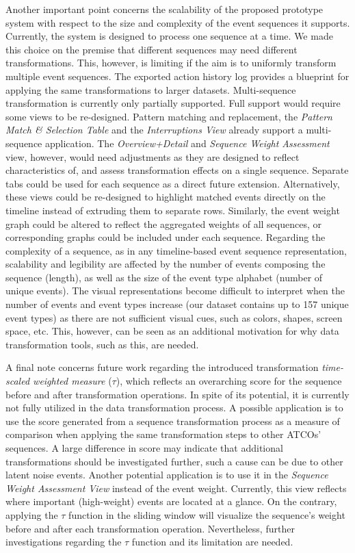 \documentclass[camera]{vgtc}                          %
\begin{document}
Another important point concerns the scalability of the proposed prototype system with respect to the size and complexity of the event sequences it supports. 
Currently, the system is designed to process one sequence at a time. We made this choice on the premise that different sequences may need different transformations. This, however, is limiting if the aim is to uniformly transform multiple event sequences. The exported action history log provides a blueprint for applying the same transformations to larger datasets. Multi-sequence transformation is currently only partially supported. Full support would require some views to be re-designed. Pattern matching and replacement, the \textit{Pattern Match \& Selection Table} and the \textit{Interruptions View} already support a multi-sequence application. 
The \textit{Overview+Detail} and \textit{Sequence Weight Assessment} view, however, would need adjustments as they are designed to reflect characteristics of, and assess transformation effects on a single sequence.
Separate tabs could be used for each sequence as a direct future extension. Alternatively, these views could be re-designed to highlight matched events directly on the timeline instead of extruding them to separate rows.
Similarly, the event weight graph could be altered to reflect the aggregated weights of all sequences, or corresponding graphs could be included under each sequence. 
Regarding the complexity of a sequence, as in any timeline-based event sequence representation, scalability and legibility are affected by the number of events composing the sequence (length), as well as the size of the event type alphabet (number of unique events).  
The visual representations become difficult to interpret when the number of events and event types increase (our dataset contains up to 157 unique event types) as there are not sufficient visual cues, such as colors, shapes, screen space, etc. This, however, can be seen as an additional motivation for why data transformation tools, such as this, are needed.

A final note concerns future work regarding the introduced transformation \textit{time-scaled weighted measure} ($ \tau $), which reflects an overarching score for the sequence before and after transformation operations.
In spite of its potential, it is currently not fully utilized in the data transformation process.
A possible application is to use the score generated from a sequence transformation process as a measure of comparison when applying the same transformation steps to other ATCOs' sequences. 
A large difference in score may indicate that additional transformations should be investigated further, such a cause can be due to other latent noise events. 
Another potential application is to use it in the \textit{Sequence Weight Assessment View} instead of the event weight. Currently, this view reflects where important (high-weight) events are located at a glance. On the contrary, applying the $ \tau $ function in the sliding window will visualize the sequence's weight before and after each transformation operation. Nevertheless, further investigations regarding the $ \tau $ function and its limitation are needed.
\end{document}
